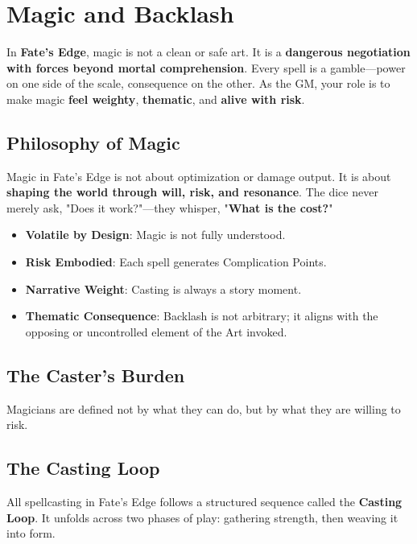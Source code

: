 \chapter{Magic and Backlash}

In \textbf{Fate's Edge}, magic is not a clean or safe art. It is a \textbf{dangerous negotiation with forces beyond mortal comprehension}. Every spell is a gamble---power on one side of the scale, consequence on the other. As the GM, your role is to make magic \textbf{feel weighty}, \textbf{thematic}, and \textbf{alive with risk}.

\section*{Philosophy of Magic}

Magic in Fate's Edge is not about optimization or damage output. It is about \textbf{shaping the world through will, risk, and resonance}. The dice never merely ask, "Does it work?"---they whisper, "\textbf{What is the cost?}"

\begin{itemize}
    \item \textbf{Volatile by Design}: Magic is not fully understood.
    \item \textbf{Risk Embodied}: Each spell generates Complication Points.
    \item \textbf{Narrative Weight}: Casting is always a story moment.
    \item \textbf{Thematic Consequence}: Backlash is not arbitrary; it aligns with the opposing or uncontrolled element of the Art invoked.
\end{itemize}

\section*{The Caster's Burden}

Magicians are defined not by what they can do, but by what they are willing to risk.

\section*{The Casting Loop}

All spellcasting in Fate's Edge follows a structured sequence called the \textbf{Casting Loop}. It unfolds across two phases of play: gathering strength, then weaving it into form.

